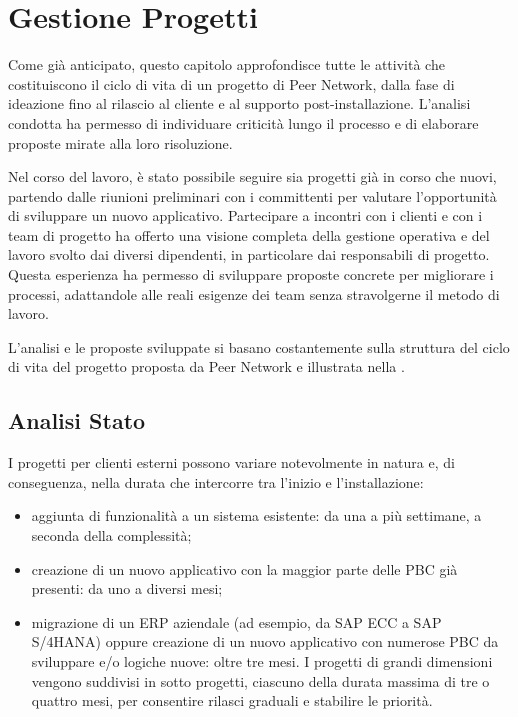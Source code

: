 \chapter{Gestione Progetti}
\label{chap:pm}


%

Come già anticipato, questo capitolo approfondisce tutte le attività che costituiscono il ciclo di vita
di un progetto di Peer Network, dalla fase di ideazione fino al rilascio al cliente e al supporto post-installazione.
L’analisi condotta ha permesso di individuare criticità lungo il processo e di elaborare proposte mirate alla loro risoluzione.

Nel corso del lavoro, è stato possibile seguire sia progetti già in corso che nuovi, partendo dalle riunioni
preliminari con i committenti per valutare l’opportunità di sviluppare un nuovo applicativo. Partecipare a incontri
con i clienti e con i team di progetto ha offerto una visione completa della gestione operativa e del lavoro
svolto dai diversi dipendenti, in particolare dai responsabili di progetto. Questa esperienza ha permesso di
sviluppare proposte concrete per migliorare i processi, adattandole alle reali esigenze dei team senza stravolgerne il metodo di lavoro.

L'analisi e le proposte sviluppate si basano costantemente sulla struttura del ciclo di vita del progetto proposta da Peer Network
e illustrata nella .

\section{Analisi Stato}
I progetti per clienti esterni possono variare notevolmente in natura e, di conseguenza, nella durata che intercorre tra l’inizio e l'installazione:
\begin{itemize}
    \item aggiunta di funzionalità a un sistema esistente: da una a più settimane, a seconda della complessità;
    \item creazione di un nuovo applicativo con la maggior parte delle \ac{PBC} già presenti: da uno a diversi mesi;
    \item migrazione di un ERP aziendale (ad esempio, da SAP ECC a SAP S/4HANA) oppure creazione di un nuovo
    applicativo con numerose \ac{PBC} da sviluppare e/o logiche nuove: oltre tre mesi. I progetti di grandi dimensioni
    vengono suddivisi in sotto progetti, ciascuno della durata massima di tre o quattro mesi, per consentire rilasci graduali e stabilire le priorità.
\end{itemize}

